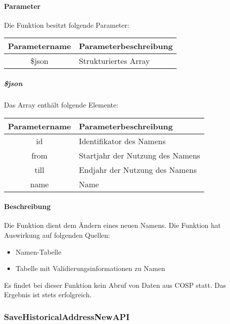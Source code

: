 \paragraph{Parameter} Die Funktion besitzt folgende Parameter:
\begin{table}[H]
	\begin{tabular}{|c|p{11cm}|}
		\hline
		\textbf{Parametername} & \textbf{Parameterbeschreibung} \\ \hline
		\$json & Strukturiertes Array \\ \hline
	\end{tabular}
\end{table}
\subparagraph{\$json}Das Array enthält folgende Elemente:
\begin{table}[H]
	\begin{tabular}{|c|p{11cm}|}
		\hline
		\textbf{Parametername} & \textbf{Parameterbeschreibung} \\ \hline
		id & Identifikator des Namens \\ \hline
		from & Startjahr der Nutzung des Namens \\ \hline
		till & Endjahr der Nutzung des Namens \\ \hline
		name & Name \\ \hline
	\end{tabular}
\end{table}
\paragraph{Beschreibung} Die Funktion dient dem Ändern eines neuen Namens. Die Funktion hat Auswirkung auf folgenden Quellen:
\begin{itemize}
	\item Namen-Tabelle
	\item Tabelle mit Validierungsinformationen zu Namen
\end{itemize}
Es findet bei dieser Funktion kein Abruf von Daten aus {\glqq COSP\grqq} statt. Das Ergebnis ist stets erfolgreich.
\subsubsection{SaveHistoricalAddressNewAPI}
